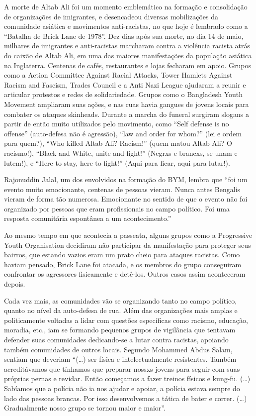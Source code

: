 A morte de Altab Ali foi um momento emblemático na formação e consolidação de organizações de imigrantes, e desencadeou diversas mobilizações da comunidade asiática e movimentos anti-racistas, no que hoje é lembrado como a “Batalha de Brick Lane de 1978”. Dez dias após sua morte, no dia 14 de maio, milhares de imigrantes e anti-racistas marcharam contra a violência racista atrás do caixão de Altab Ali, em uma das maiores manifestações da população asiática na Inglaterra. Centenas de cafés, restaurantes e lojas fecharam em apoio. Grupos como a Action Committee Against Racial Attacks, Tower Hamlets Against Racism and Fascism, Trades Council e a Anti Nazi League ajudaram a reunir e articular protestos e redes de solidariedade. Grupos como o Bangladesh Youth Movement ampliaram suas ações, e nas ruas havia gangues de jovens locais para combater os ataques skinheads. Durante a marcha do funeral surgiram slogans a partir de então muito utilizados pelo movimento, como “Self defense is no offense” (auto-defesa não é agressão), “law and order for whom?” (lei e ordem para quem?), “Who killed Altab Ali? Racism!” (quem matou Altab Ali? O racismo!), “Black and White, unite and fight!” (Negrxs e brancxs, se unam e lutem!), e “Here to stay, here to fight!” (Aqui para ficar, aqui para lutar!).

Rajonuddin Jalal, um dos envolvidos na formação do BYM, lembra que “foi um evento muito emocionante, centenas de pessoas vieram. Nunca antes Bengalis vieram de forma tão numerosa. Emocionante no sentido de que o evento não foi organizado por pessoas que eram profissionais no campo político. Foi uma resposta comunitária espontânea a um acontecimento.”

Ao mesmo tempo em que acontecia a passeata, alguns grupos como a Progressive Youth Organisation decidiram não participar da manifestação para proteger seus bairros, que estando vazios eram um prato cheio para ataques racistas. Como haviam pensado, Brick Lane foi atacada, e os membros do grupo conseguiram confrontar os agressores fisicamente e detê-los. Outros casos assim aconteceram depois.

Cada vez mais, as comunidades vão se organizando tanto no campo político, quanto no nível da auto-defesa de rua. Além das organizações mais amplas e politicamente voltadas a lidar com questões específicas como racismo, educação, moradia, etc., iam se formando pequenos grupos de vigilância que tentavam defender suas comunidades dedicando-se a lutar contra racistas, apoiando também comunidades de outros locais. Segundo Mohammed Abdus Salam, sentiam que deveriam “(…) ser física e intelectualmente resistentes. Também acreditávamos que tínhamos que preparar nossxs jovens para seguir com suas próprias pernas e revidar. Então começamos a fazer treinos físicos e kung-fu. (…) Sabíamos que a polícia não ia nos ajudar e apoiar, a polícia estava sempre do lado das pessoas brancas. Por isso desenvolvemos a tática de bater e correr. (…) Gradualmente nosso grupo se tornou maior e maior”.

